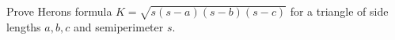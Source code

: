 Prove Heron\textquotesingle s formula $K=\sqrt{s(s-a)(s-b)(s-c)}$ for a triangle of side lengths $a,b,c$ and semiperimeter $s$.
